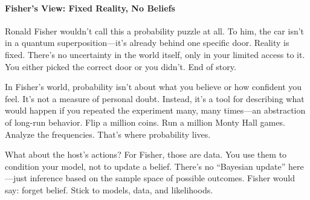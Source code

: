 \paragraph{Fisher’s View: Fixed Reality, No Beliefs}

Ronald Fisher wouldn’t call this a probability puzzle at all. To him, the car isn’t in a quantum superposition—it’s already behind one specific door. Reality is fixed. There’s no uncertainty in the world itself, only in your limited access to it. You either picked the correct door or you didn’t. End of story.

In Fisher’s world, probability isn’t about what you believe or how confident you feel. It’s not a measure of personal doubt. Instead, it’s a tool for describing what would happen if you repeated the experiment many, many times—an abstraction of long-run behavior. Flip a million coins. Run a million Monty Hall games. Analyze the frequencies. That’s where probability lives.

What about the host’s actions? For Fisher, those are data. You use them to condition your model, not to update a belief. There’s no “Bayesian update” here—just inference based on the sample space of possible outcomes. Fisher would say: forget belief. Stick to models, data, and likelihoods.



